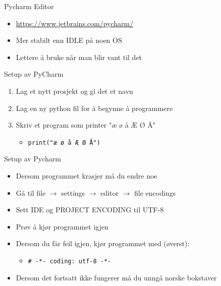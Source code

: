 \documentclass[screen, aspectratio=169]{beamer}
\begin{document}

\begin{frame}{Pycharm Editor}
	\begin{itemize}
		\item \href{https://www.jetbrains.com/pycharm/}{https://www.jetbrains.com/pycharm/}
		\item Mer stabilt enn IDLE på noen OS
		\item Lettere å bruke når man blir vant til det
	\end{itemize}
\end{frame}

\begin{frame}[fragile]{Setup av PyCharm}
	\begin{enumerate}
		\item Lag et nytt prosjekt og gi det et navn
		\item Lag en ny python fil for å begynne å programmere
		\item Skriv et program som printer "æ ø å Æ Ø Å"
		\begin{itemize}
			\item \lstinline|print("æ ø å Æ Ø Å")|
		\end{itemize}
	\end{enumerate}
\end{frame}

\begin{frame}[fragile]{Setup av Pycharm}
	\begin{itemize}
		\item Dersom programmet krasjer må du endre noe
		\item Gå til file $\rightarrow$ settings $\rightarrow$ editor $\rightarrow$ file encodings
		\item Sett IDE og PROJECT ENCODING til UTF-8
		\item Prøv å kjør programmet igjen
		\item Dersom du får feil igjen, kjør programmet med (øverst):
		\begin{itemize}
			\item \lstinline|# -*- coding: utf-8 -*-|
		\end{itemize}
		\item Dersom det fortsatt ikke fungerer må du unngå norske bokstaver
	\end{itemize}
\end{frame}
\end{document}

